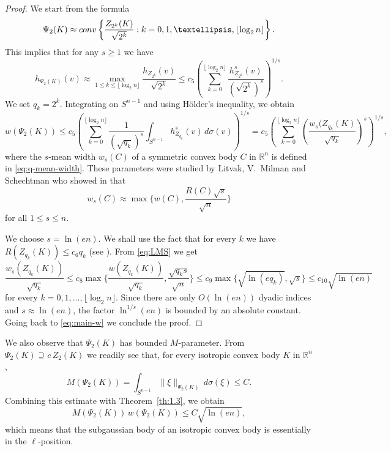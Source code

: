 \documentclass[10pt,a4paper]{amsart}
\numberwithin{equation}{section}
\newcommand{\ls}{\leqslant}
\newcommand{\gr}{\geqslant}
\begin{document}
\begin{proof}We start from the formula
\begin{equation*}\Psi_2(K)\approx {\rm conv} \left\{\frac{Z_{2^k}(K )}{\sqrt{2^k}}: k=0,1,\ldots ,\lfloor\log_{2}n\rfloor \right\}. \end{equation*}
This implies that for any $s\gr 1$ we have
\[h_{\Psi_2(K)}(v)\approx \max_{1\ls k\ls \lfloor\log_2n\rfloor}\frac{h_{Z_{2^k}}(v)}{\sqrt{2^k}}
\ls c_5\left(\sum_{k=0}^{\lfloor\log_2n\rfloor}\frac{h^s_{Z_{2^k}}(v)}{(\sqrt{2^k})^s}\right)^{1/s}.\]
We set $q_k=2^k$. Integrating on $S^{n-1}$ and using H\"{o}lder's inequality, we obtain
\begin{equation}\label{eq:main-w}w(\Psi_2(K))\ls c_5\left(\sum_{k=0}^{\lfloor\log_2n\rfloor}\frac{1}{(\sqrt{q_k})^s}\int_{S^{n-1}}h^s_{Z_{q_k}}(v)\,d\sigma(v)\right)^{1/s}
=c_5\left(\sum_{k=0}^{\lfloor\log_2n\rfloor}\left(\frac{w_s(Z_{q_k}(K)}{\sqrt{q_k}}\right)^s\right)^{1/s},\end{equation}
where the $s$-mean width $w_s(C)$ of a symmetric convex body $C$ in $\mathbb{R}^n$ is defined in \eqref{eq:q-mean-width}.
These parameters were studied  by Litvak, V.~Milman and Schechtman who showed in \cite{Litvak-VMilman-Schechtman-1998} that
\begin{equation}\label{eq:LMS}w_s(C)\approx \max\bigg\{w(C),\frac{R(C)\sqrt{s}}{\sqrt{n}}\bigg\}
\end{equation} for all $1\ls s\ls n$.

We choose $s=\ln(en)$. We shall use the fact that for every $k$ we have $R(Z_{q_k}(K))\ls c_6q_k$ (see \cite[Chapter~5]{BGVV-book}).
From \eqref{eq:LMS} we get
\begin{equation}\label{eq:LMS-Zq}\frac{w_s(Z_{q_k}(K))}{\sqrt{q_k}}\ls c_8\max\bigg\{ \frac{w(Z_{q_k}(K))}{\sqrt{q_k}},\frac{\sqrt{q_ks}}{\sqrt{n}}\bigg\}
\ls c_9\max\bigg\{ \sqrt{\ln(eq_k)},\sqrt{s}\bigg\}\ls c_{10}\sqrt{\ln(en)}\end{equation}
for every $k=0,1,\ldots ,\lfloor\log_2n\rfloor$. 
Since there are only $O(\ln(en))$
dyadic indices and $s\approx \ln(en)$, the factor $\ln^{1/s}(en)$ is bounded by an absolute
constant. Going back to \eqref{eq:main-w} we conclude the proof.
\end{proof}

We also observe that $\Psi_2(K)$ has bounded  $M$-parameter. From $\Psi_2(K)\supseteq c\,Z_2(K)$ we readily see that, for every isotropic convex body $K$ in $\mathbb{R}^n$,
\[M(\Psi_2(K))=\int_{S^{n-1}}\|\xi\|_{\Psi_2(K)}\,d\sigma(\xi)\ls C.\]
Combining this estimate with Theorem~\ref{th:1.3}, we obtain
\begin{equation}\label{eq:ell-psi}M(\Psi_2(K))\,w(\Psi_2(K))\ls C\sqrt{\ln(en)},\end{equation}
which means that the subgaussian body of an isotropic convex body is essentially in the $\ell$-position.
\end{document}
